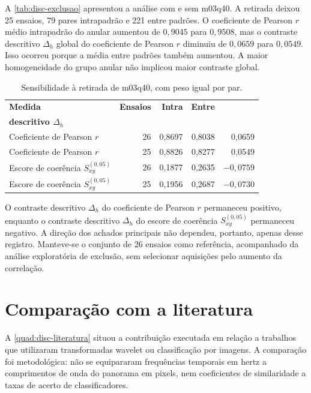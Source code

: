 A \autoref{tab:disc-exclusao} apresentou a análise com e sem m03q40.
A retirada deixou 25 ensaios, 79 pares intrapadrão e 221 entre padrões.
O coeficiente de Pearson $r$ médio intrapadrão do anular aumentou de
$0{,}9045$ para $0{,}9508$, mas o contraste descritivo $\Delta_h$ global do coeficiente
de Pearson $r$ diminuiu de $0{,}0659$ para $0{,}0549$.
Isso ocorreu porque a média entre padrões também aumentou.
A maior homogeneidade do grupo anular não implicou maior contraste global.

\begin{table}[htbp]
  \centering
  \caption{Sensibilidade à retirada de m03q40, com peso igual por par.}
  \label{tab:disc-exclusao}
  \small
  \begin{tabular}{l r r r r}
    \hline
    \textbf{Medida} & \textbf{Ensaios} & \textbf{Intra} & \textbf{Entre} &
    \shortstack{\textbf{Contraste}\\\textbf{descritivo $\Delta_h$}}\\
    \hline
    Coeficiente de Pearson $r$ & 26 & 0,8697 & 0,8038 & 0,0659\\
    Coeficiente de Pearson $r$ & 25 & 0,8826 & 0,8277 & 0,0549\\
    Escore de coerência $S_{xy}^{(0{,}05)}$ & 26 & 0,1877 & 0,2635 & $-0{,}0759$\\
    Escore de coerência $S_{xy}^{(0{,}05)}$ & 25 & 0,1956 & 0,2687 & $-0{,}0730$\\
    \hline
  \end{tabular}
\end{table}

O contraste descritivo $\Delta_h$ do coeficiente de Pearson $r$ permaneceu positivo,
enquanto o contraste descritivo $\Delta_h$ do escore de coerência
$S_{xy}^{(0{,}05)}$ permaneceu negativo. A direção dos achados principais
não dependeu, portanto, apenas desse registro. Manteve-se o conjunto de 26 ensaios
como referência, acompanhado da análise exploratória de exclusão, sem selecionar
aquisições pelo aumento da correlação.

\section{Comparação com a literatura}\label{sec:disc-literatura}

A \autoref{quad:disc-literatura} situou a contribuição executada em relação
a trabalhos que utilizaram transformadas wavelet ou classificação por imagens.
A comparação foi metodológica: não se equipararam frequências temporais em hertz
a comprimentos de onda do panorama em pixels, nem coeficientes de similaridade
a taxas de acerto de classificadores.

